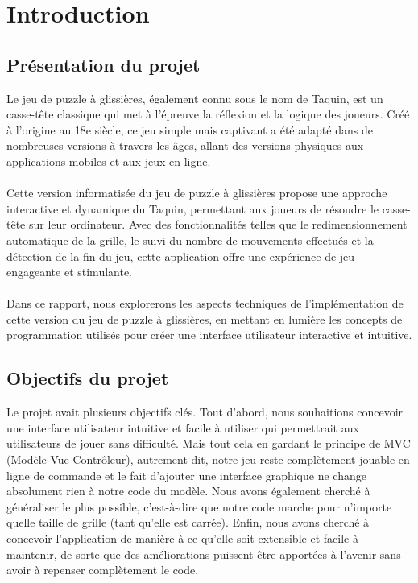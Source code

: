 \documentclass[a4paper,10pt]{article}
\title{\projet}
\author{\contributeurs \\ \\ Responsable de TP : \chargeTP}
\date{\today}
\begin{document}
\maketitle
\thispagestyle{mylogo} %

\newpage
\tableofcontents
\clearpage

\section{Introduction}

\subsection{Présentation du projet}
Le jeu de puzzle à glissières, également connu sous le nom de Taquin, est un casse-tête
classique qui met à l'épreuve la réflexion et la logique des joueurs. Créé à l'origine au 18e
siècle, ce jeu simple mais captivant a été adapté dans de nombreuses versions à travers les
âges, allant des versions physiques aux applications mobiles et aux jeux en ligne.\\ \\
Cette version informatisée du jeu de puzzle à glissières propose une approche interactive et
dynamique du Taquin, permettant aux joueurs de résoudre le casse-tête sur leur ordinateur.
Avec des fonctionnalités telles que le redimensionnement automatique de la grille,
le suivi du nombre de mouvements effectués et la détection de la fin du jeu,
cette application offre une expérience de jeu engageante et stimulante.\\ \\
Dans ce rapport, nous explorerons les aspects techniques de l'implémentation de cette version du
jeu de puzzle à glissières,
en mettant en lumière les concepts de programmation utilisés pour créer une interface
utilisateur interactive et intuitive.

\subsection{Objectifs du projet}
Le projet avait plusieurs objectifs clés. Tout d'abord, nous souhaitions concevoir une interface utilisateur intuitive et facile à utiliser qui permettrait aux utilisateurs de jouer sans difficulté. Mais tout cela en gardant le principe de MVC (Modèle-Vue-Contrôleur), autrement dit, notre jeu reste complètement jouable en ligne de commande et le fait d'ajouter une interface graphique ne change absolument rien à notre code du modèle. Nous avons également cherché à généraliser le plus possible, c'est-à-dire que notre code marche pour n'importe quelle taille de grille (tant qu'elle est carrée). Enfin, nous avons cherché à concevoir l'application de manière à ce qu'elle soit extensible et facile à maintenir, de sorte que des améliorations puissent être apportées à l'avenir sans avoir à repenser complètement le code.
\end{document}
